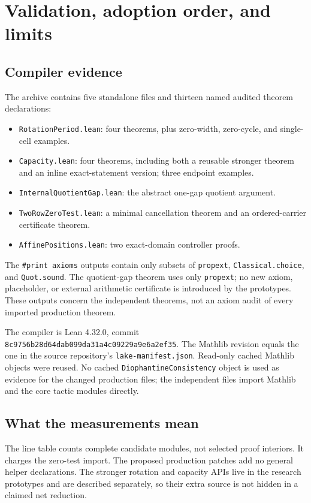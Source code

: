 \documentclass[11pt,letterpaper]{article}
\newcommand{\code}[1]{\nolinkurl{#1}}
\begin{document}
\section{Validation, adoption order, and limits}

\subsection{Compiler evidence}

The archive contains five standalone files and thirteen named audited theorem declarations:
\begin{itemize}
\item \code{RotationPeriod.lean}: four theorems, plus zero-width, zero-cycle, and single-cell examples.
\item \code{Capacity.lean}: four theorems, including both a reusable stronger theorem and an inline exact-statement version; three endpoint examples.
\item \code{InternalQuotientGap.lean}: the abstract one-gap quotient argument.
\item \code{TwoRowZeroTest.lean}: a minimal cancellation theorem and an ordered-carrier certificate theorem.
\item \code{AffinePositions.lean}: two exact-domain controller proofs.
\end{itemize}
The \texttt{\#print axioms} outputs contain only subsets of \code{propext}, \code{Classical.choice}, and \code{Quot.sound}. The quotient-gap theorem uses only \code{propext}; no new axiom, placeholder, or external arithmetic certificate is introduced by the prototypes. These outputs concern the independent theorems, not an axiom audit of every imported production theorem.

The compiler is Lean 4.32.0, commit \texttt{8c9756b28d64dab099da31a4c09229a9e6a2ef35}. The Mathlib revision equals the one in the source repository's \code{lake-manifest.json}. Read-only cached Mathlib objects were reused. No cached \code{DiophantineConsistency} object is used as evidence for the changed production files; the independent files import Mathlib and the core tactic modules directly.

\subsection{What the measurements mean}

The line table counts complete candidate modules, not selected proof interiors. It charges the zero-test import. The proposed production patches add no general helper declarations. The stronger rotation and capacity APIs live in the research prototypes and are described separately, so their extra source is not hidden in a claimed net reduction.
\end{document}

